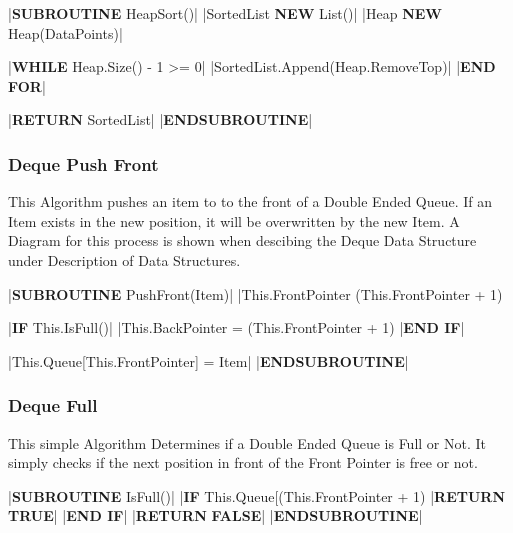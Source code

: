 \begin{flushleft}
                \begin{pseudocode}
|\textbf{SUBROUTINE} HeapSort()|
    |SortedList \leftarrow \textbf{NEW} List()|
    |Heap \leftarrow \textbf{NEW} Heap(DataPoints)|

    |\textbf{WHILE} Heap.Size() - 1 >= 0|
        |SortedList.Append(Heap.RemoveTop)|
    |\textbf{END FOR}|

    |\textbf{RETURN} SortedList|
|\textbf{ENDSUBROUTINE}|
                \end{pseudocode}

                \vspace{0.5cm}
            \subsubsection{Deque Push Front}
                This Algorithm pushes an item to to the front of a Double Ended Queue. If an Item exists in the new position, it will be overwritten by
                the new Item. A Diagram for this process is shown when descibing the Deque Data Structure under Description of Data Structures.
                \vspace{0.2cm}

                \begin{pseudocode}
|\textbf{SUBROUTINE} PushFront(Item)|
    |This.FrontPointer \leftarrow (This.FrontPointer + 1) %

    |\textbf{IF} This.IsFull()|
        |This.BackPointer = (This.FrontPointer + 1) %
    |\textbf{END IF}|
    
    |This.Queue[This.FrontPointer] = Item|
|\textbf{ENDSUBROUTINE}|
                \end{pseudocode}

                \vspace{0.5cm}
            \subsubsection{Deque Full}
                This simple Algorithm Determines if a Double Ended Queue is Full or Not. It simply checks if the next position in front of the
                Front Pointer is free or not.
                \vspace{0.2cm}

                \begin{pseudocode}
|\textbf{SUBROUTINE} IsFull()|
    |\textbf{IF} This.Queue[(This.FrontPointer + 1) %
        |\textbf{RETURN} \textbf{TRUE}|
    |\textbf{END IF}|
    |\textbf{RETURN} \textbf{FALSE}|
|\textbf{ENDSUBROUTINE}|
                \end{pseudocode}


\end{flushleft}
